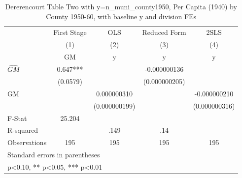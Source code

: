 \begin{table}[htbp]\centering
\def\sym#1{\ifmmode^{#1}\else\(^{#1}\)\fi}
\caption{Dererencourt Table Two with y=n\_muni\_county1950, Per Capita (1940) by County 1950-60, with baseline y and division FEs}
\begin{tabular}{l*{4}{c}}
\toprule
                    & First Stage   &         OLS   &Reduced Form   &        2SLS   \\
                    &\multicolumn{1}{c}{(1)}&\multicolumn{1}{c}{(2)}&\multicolumn{1}{c}{(3)}&\multicolumn{1}{c}{(4)}\\
                    &\multicolumn{1}{c}{GM}&\multicolumn{1}{c}{y}&\multicolumn{1}{c}{y}&\multicolumn{1}{c}{y}\\
\midrule
$\hat{GM}$          &       0.647***&               &-0.000000136   &               \\
                    &    (0.0579)   &               &(0.000000205)   &               \\
\addlinespace
GM                  &               & 0.000000310   &               &-0.000000210   \\
                    &               &(0.000000199)   &               &(0.000000316)   \\
\midrule
F-Stat              &      25.204   &               &               &               \\
R-squared           &               &        .149   &         .14   &               \\
Observations        &         195   &         195   &         195   &         195   \\
\bottomrule
\multicolumn{5}{l}{\footnotesize Standard errors in parentheses}\\
\multicolumn{5}{l}{\footnotesize * p<0.10, ** p<0.05, *** p<0.01}\\
\end{tabular}
\end{table}
